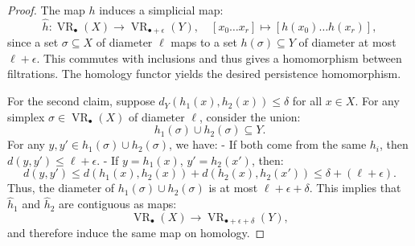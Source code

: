 \documentclass[10pt,a4paper]{amsart}
\begin{document}
\begin{proof}
The map \( h \) induces a simplicial map:
\[
\hat{h} : \operatorname{VR}_{\bullet}(X) \to \operatorname{VR}_{\bullet+\epsilon}(Y), \quad [x_0 \dots x_r] \mapsto [h(x_0) \dots h(x_r)],
\]
since a set \( \sigma \subseteq X \) of diameter \( \ell \) maps to a set \( h(\sigma) \subseteq Y \) of diameter at most \( \ell + \epsilon \). This commutes with inclusions and thus gives a homomorphism between filtrations. The homology functor yields the desired persistence homomorphism.

For the second claim, suppose \( d_Y(h_1(x), h_2(x)) \leq \delta \) for all \( x \in X \). For any simplex \( \sigma \in \operatorname{VR}_{\bullet}(X) \) of diameter \( \ell \), consider the union:
\[
h_1(\sigma) \cup h_2(\sigma) \subseteq Y.
\]
For any \( y, y' \in h_1(\sigma) \cup h_2(\sigma) \), we have:
- If both come from the same \( h_i \), then \( d(y, y') \leq \ell + \epsilon \).
- If \( y = h_1(x) \), \( y' = h_2(x') \), then:
\[
d(y, y') \leq d(h_1(x), h_2(x)) + d(h_2(x), h_2(x')) \leq \delta + (\ell + \epsilon).
\]
Thus, the diameter of \( h_1(\sigma) \cup h_2(\sigma) \) is at most \( \ell + \epsilon + \delta \). This implies that \( \hat{h}_1 \) and \( \hat{h}_2 \) are contiguous as maps:
\[
\operatorname{VR}_{\bullet}(X) \to \operatorname{VR}_{\bullet+\epsilon+\delta}(Y),
\]
and therefore induce the same map on homology.
\end{proof}
\end{document}
